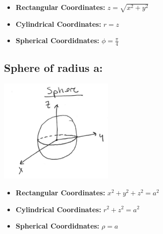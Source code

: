 
\begin{itemize}
\item \textbf{Rectangular Coordinates:} \(z=\sqrt{x^2+y^2}\)
\item \textbf{Cylindrical Coordinates:} \(r=z\)
\item \textbf{Spherical Coordidnates:} \(\phi = \frac{\pi}{4}\)
\end{itemize}
%

\subsection*{Sphere of radius a:}
\includegraphics[height=2in]{Ch12s7-Sphere.png}


\begin{itemize}
\item \textbf{Rectangular Coordinates:} \(x^2+y^2+z^2=a^2\)
\item \textbf{Cylindrical Coordinates:} \(r^2+z^2 = a^2\)
\item \textbf{Spherical Coordidnates:} \(\rho=a\)
\end{itemize}






